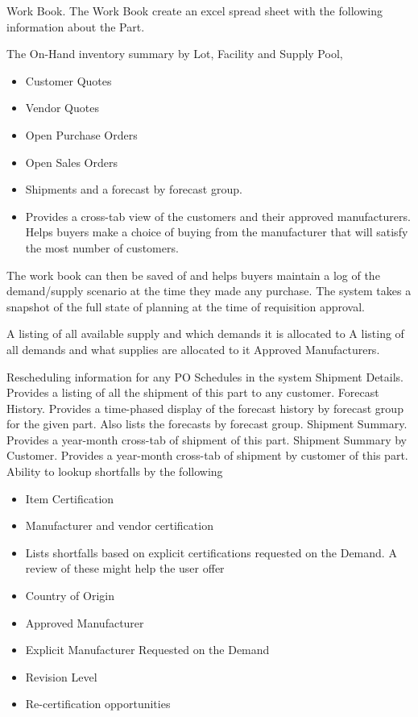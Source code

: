 \documentclass[letterpaper,10pt,english]{sphinxmanual}
\begin{document}
Work Book. The Work Book create an excel spread sheet with the following
information about the Part.

The On-Hand inventory summary by Lot, Facility and Supply Pool,
\begin{itemize}
\item {} 
Customer Quotes

\item {} 
Vendor Quotes

\item {} 
Open Purchase Orders

\item {} 
Open Sales Orders

\item {} 
Shipments and a forecast by forecast group.

\item {} 
Provides a cross-tab view of the customers and their approved manufacturers. Helps buyers make a choice of buying from the manufacturer that will satisfy the most number of customers.

\end{itemize}

The work book can then be saved of and helps buyers
maintain a log of the demand/supply scenario at the time they made any
purchase. The system takes a snapshot of the full state of planning at the time
of requisition approval.

A listing of all available supply and which demands it is
allocated to A listing of all demands and what supplies are allocated to
it Approved Manufacturers.

Rescheduling information for any PO Schedules in the system Shipment
Details. Provides a listing of all the shipment of this part to any
customer. Forecast History. Provides a time-phased display of the
forecast history by forecast group for the given part. Also lists the
forecasts by forecast group. Shipment Summary. Provides a year-month
cross-tab of shipment of this part. Shipment Summary by Customer.
Provides a year-month cross-tab of shipment by customer of this part.
Ability to lookup shortfalls by the following
\begin{itemize}
\item {} 
Item Certification

\item {} 
Manufacturer and vendor certification

\item {} 
Lists shortfalls based on explicit certifications requested on the
Demand. A review of these might help the user offer

\item {} 
Country of Origin

\item {} 
Approved Manufacturer

\item {} 
Explicit Manufacturer Requested on the Demand

\item {} 
Revision Level

\item {} 
Re-certification opportunities

\end{itemize}
\end{document}
